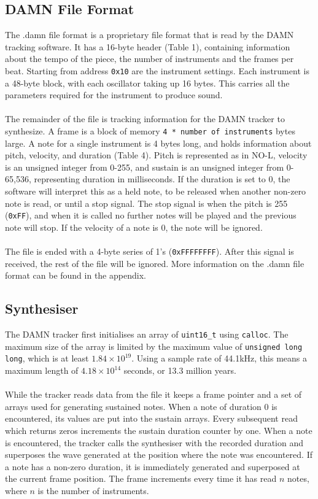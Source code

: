 \documentclass[11pt]{article}
\begin{document}
\subsection{DAMN File Format}
The .damn file format is a proprietary file format that is read by the DAMN tracking software. It has a 16-byte header (Table 1), containing information about the tempo of the piece, the number of instruments and the frames per beat. Starting from address \texttt{0x10} are the instrument settings. Each instrument is a 48-byte block, with each oscillator taking up 16 bytes. This carries all the parameters required for the instrument to produce sound.\\\\
The remainder of the file is tracking information for the DAMN tracker to synthesize. A frame is a block of memory \texttt{4 * number of instruments} bytes large. A note for a single instrument is 4 bytes long, and holds information about pitch, velocity, and duration (Table 4). Pitch is represented as in NO-L, velocity is an unsigned integer from 0-255, and sustain is an unsigned integer from 0-65,536, representing duration in milliseconds. If the duration is set to 0, the software will interpret this as a held note, to be released when another non-zero note is read, or until a stop signal. The stop signal is when the pitch is 255 (\texttt{0xFF}), and when it is called no further notes will be played and the previous note will stop. If the velocity of a note is 0, the note will be ignored.\\\\
The file is ended with a 4-byte series of 1's (\texttt{0xFFFFFFFF}). After this signal is received, the rest of the file will be ignored. More information on the .damn file format can be found in the appendix.

\subsection{Synthesiser}
The DAMN tracker first initialises an array of \texttt{uint16\_t} using \texttt{calloc}. The maximum size of the array is limited by the maximum value of \texttt{unsigned long long}, which is at least \(1.84\times 10^{19}\). Using a sample rate of 44.1kHz, this means a maximum length of \(4.18\times 10^{14}\) seconds, or 13.3 million years.
\\\\
While the tracker reads data from the file it keeps a frame pointer and a set of arrays used for generating sustained notes. When a note of duration 0 is encountered, its values are put into the sustain arrays. Every subsequent read which returns zeros increments the sustain duration counter by one. When a note is encountered, the tracker calls the synthesiser with the recorded duration and superposes the wave generated at the position where the note was encountered. If a note has a non-zero duration, it is immediately generated and superposed at the current frame position. The frame increments every time it has read \(n\) notes, where \(n\) is the number of instruments.
\end{document}
